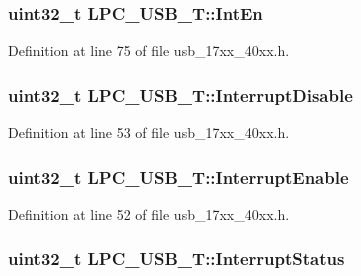 \subsubsection[{\texorpdfstring{Int\+En}{IntEn}}]{ uint32\+\_\+t L\+P\+C\+\_\+\+U\+S\+B\+\_\+\+T\+::\+Int\+En}\hypertarget{structLPC__USB__T_a7e6d936a2d816c29698d1e84cacf7dd2}{}\label{structLPC__USB__T_a7e6d936a2d816c29698d1e84cacf7dd2}


Definition at line 75 of file usb\+\_\+17xx\+\_\+40xx.\+h.

\subsubsection[{\texorpdfstring{Interrupt\+Disable}{InterruptDisable}}]{ uint32\+\_\+t L\+P\+C\+\_\+\+U\+S\+B\+\_\+\+T\+::\+Interrupt\+Disable}\hypertarget{structLPC__USB__T_add213a230e4bde47f6bc929bf64a5517}{}\label{structLPC__USB__T_add213a230e4bde47f6bc929bf64a5517}


Definition at line 53 of file usb\+\_\+17xx\+\_\+40xx.\+h.

\subsubsection[{\texorpdfstring{Interrupt\+Enable}{InterruptEnable}}]{ uint32\+\_\+t L\+P\+C\+\_\+\+U\+S\+B\+\_\+\+T\+::\+Interrupt\+Enable}\hypertarget{structLPC__USB__T_af40ec2849ec75a04f582ae55a9822540}{}\label{structLPC__USB__T_af40ec2849ec75a04f582ae55a9822540}


Definition at line 52 of file usb\+\_\+17xx\+\_\+40xx.\+h.

\subsubsection[{\texorpdfstring{Interrupt\+Status}{InterruptStatus}}]{ uint32\+\_\+t L\+P\+C\+\_\+\+U\+S\+B\+\_\+\+T\+::\+Interrupt\+Status}\hypertarget{structLPC__USB__T_a1d1387bdd1f39c2120a2d272c46b6b02}{}\label{structLPC__USB__T_a1d1387bdd1f39c2120a2d272c46b6b02}


